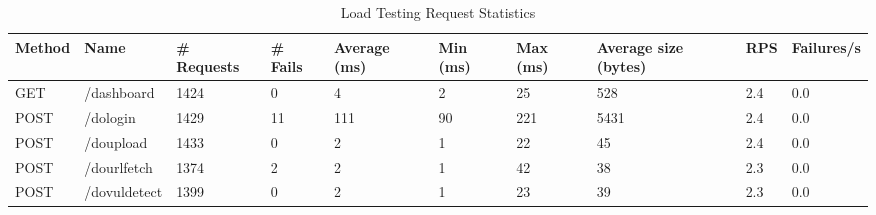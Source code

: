 \begin{table*}[h]
  \caption{Load Testing Request Statistics}
  \label{tab:loadreqstat}
  \begin{tabular}{|p{}|p{}|p{}|p{}|p{}|p{}|p{}|p{}|p{}|p{}|}
    \hline
    {\textbf{Method}} & {\textbf{Name}} & {\textbf{\# Requests}} & {\textbf{\# Fails}} & {\textbf{Average (ms)}} & {\textbf{Min (ms)}} & {\textbf{Max (ms)}} & {\textbf{Average size (bytes)}} & {\textbf{RPS}} & {\textbf{Failures/s}} \\ \hline
    GET                                   & /dashboard                         & 1424                                      & 0                                      & 4                                          & 2                                      & 25                                     & 528                                                & 2.4                               & 0.0                                      \\ \hline
    {\color[HTML]{2A2B2E} POST}           & /dologin                           & 1429                                      & 11                                     & 111                                        & 90                                     & 221                                    & 5431                                               & 2.4                               & 0.0                                      \\ \hline
    {\color[HTML]{2A2B2E} POST}           & /doupload                          & 1433                                      & 0                                      & 2                                          & 1                                      & 22                                     & 45                                                 & 2.4                               & 0.0                                      \\ \hline
    POST                                  & /dourlfetch                        & 1374                                      & 2                                      & 2                                          & 1                                      & 42                                     & 38                                                 & 2.3                               & 0.0                                      \\ \hline
    POST                                  & /dovuldetect                       & 1399                                      & 0                                      & 2                                          & 1                                      & 23                                     & 39                                                 & 2.3                               & 0.0                                      \\ \hline

\end{tabular}
\end{table*}
